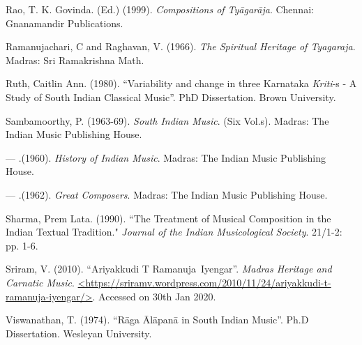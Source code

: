 \begin{thebibliography}{99}
  Rao, T. K. Govinda. (Ed.) (1999). \textit{Compositions of Tyāgarāja}. Chennai: Gnanamandir Publications.

  Ramanujachari, C and Raghavan, V. (1966). \textit{The Spiritual Heritage of Tyagaraja}. Madras: Sri Ramakrishna Math.

  Ruth, Caitlin Ann. (1980). “Variability and change in three Karnataka \textit{Kriti}-s - A Study of South Indian Classical Music”. PhD Dissertation. Brown University.

  Sambamoorthy, P. (1963-69). \textit{South Indian Music}. (Six Vol.s). Madras: The Indian Music Publishing House.

  — .(1960). \textit{History of Indian Music}. Madras: The Indian Music Publishing House.

  — .(1962). \textit{Great Composers}. Madras: The Indian Music Publishing House.

  Sharma, Prem Lata. (1990). ``The Treatment of Musical Composition in the Indian Textual Tradition." \textit{Journal of the Indian Musicological Society}. 21/1-2: pp. 1-6.

  Sriram, V. (2010). “Ariyakkudi T Ramanuja Iyengar”. \textit{Madras Heritage and Carnatic Music}. \url{<https://sriramv.wordpress.com/2010/11/24/ariyakkudi-t-ramanuja-iyengar/>}. Accessed on 30th Jan 2020.

  Viswanathan, T. (1974). “Rāga Ālāpanā in South Indian Music”. Ph.D Dissertation. Wesleyan University.

 \end{thebibliography}

